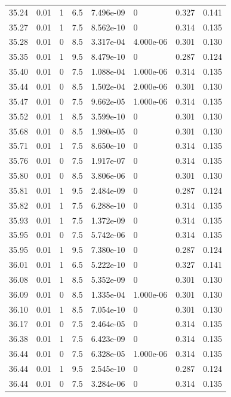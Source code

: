 \documentclass[preview]{standalone}
\begin{document}
{{{{{{{{{{\begin{tabular}{L{1.2cm}C{1.2cm} C{0.3cm}C{0.5cm} C{1.4cm}C{1.4cm} C{1.4cm}C{1.4cm}}
  35.24  &  0.01  & 1     & 6.5 &  7.496e-09  & 0  & 0.327 &  0.141   \\ 
  35.27  &  0.01  & 1     & 7.5 &  8.562e-10  & 0  & 0.314 &  0.135   \\ 
  35.28  &  0.01  & 0     & 8.5 &  3.317e-04  & 4.000e-06  & 0.301 &  0.130   \\ 
  35.35  &  0.01  & 1     & 9.5 &  8.479e-10  & 0  & 0.287 &  0.124   \\ 
  35.40  &  0.01  & 0     & 7.5 &  1.088e-04  & 1.000e-06  & 0.314 &  0.135   \\ 
  35.44  &  0.01  & 0     & 8.5 &  1.502e-04  & 2.000e-06  & 0.301 &  0.130   \\ 
  35.47  &  0.01  & 0     & 7.5 &  9.662e-05  & 1.000e-06  & 0.314 &  0.135   \\ 
  35.52  &  0.01  & 1     & 8.5 &  3.599e-10  & 0  & 0.301 &  0.130   \\ 
  35.68  &  0.01  & 0     & 8.5 &  1.980e-05  & 0  & 0.301 &  0.130   \\ 
  35.71  &  0.01  & 1     & 7.5 &  8.650e-10  & 0  & 0.314 &  0.135   \\ 
  35.76  &  0.01  & 0     & 7.5 &  1.917e-07  & 0  & 0.314 &  0.135   \\ 
  35.80  &  0.01  & 0     & 8.5 &  3.806e-06  & 0  & 0.301 &  0.130   \\ 
  35.81  &  0.01  & 1     & 9.5 &  2.484e-09  & 0  & 0.287 &  0.124   \\ 
  35.82  &  0.01  & 1     & 7.5 &  6.288e-10  & 0  & 0.314 &  0.135   \\ 
  35.93  &  0.01  & 1     & 7.5 &  1.372e-09  & 0  & 0.314 &  0.135   \\ 
  35.95  &  0.01  & 0     & 7.5 &  5.742e-06  & 0  & 0.314 &  0.135   \\ 
  35.95  &  0.01  & 1     & 9.5 &  7.380e-10  & 0  & 0.287 &  0.124   \\ 
  36.01  &  0.01  & 1     & 6.5 &  5.222e-10  & 0  & 0.327 &  0.141   \\ 
  36.08  &  0.01  & 1     & 8.5 &  5.352e-09  & 0  & 0.301 &  0.130   \\ 
  36.09  &  0.01  & 0     & 8.5 &  1.335e-04  & 1.000e-06  & 0.301 &  0.130   \\ 
  36.10  &  0.01  & 1     & 8.5 &  7.054e-10  & 0  & 0.301 &  0.130   \\ 
  36.17  &  0.01  & 0     & 7.5 &  2.464e-05  & 0  & 0.314 &  0.135   \\ 
  36.38  &  0.01  & 1     & 7.5 &  6.423e-09  & 0  & 0.314 &  0.135   \\ 
  36.44  &  0.01  & 0     & 7.5 &  6.328e-05  & 1.000e-06  & 0.314 &  0.135   \\ 
  36.44  &  0.01  & 1     & 9.5 &  2.545e-10  & 0  & 0.287 &  0.124   \\ 
  36.44  &  0.01  & 0     & 7.5 &  3.284e-06  & 0  & 0.314 &  0.135   \\ 
\hline 
\end{tabular} 

}}}}}}}}}}
\end{document}
